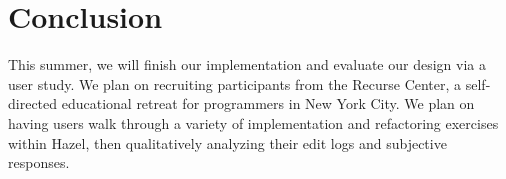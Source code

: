 \documentclass[runningheads]{llncs}
\newcommand{\Hazel}{\textsf{Hazel}\xspace}
\begin{document}
\section{Conclusion} \label{sec:conclusion}

This summer, we will finish our implementation and evaluate our design via a user study.
We plan on recruiting participants from the Recurse Center, a self-directed educational retreat for programmers in New York City. We plan on having users walk through a variety of implementation and refactoring exercises within \Hazel, then qualitatively analyzing their edit logs and subjective responses.

%
%
%
%
\end{document}
